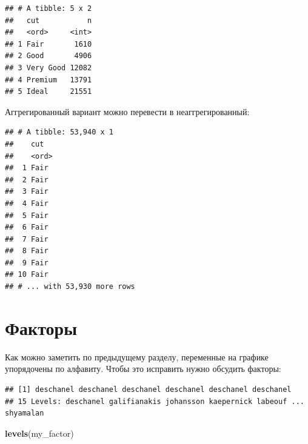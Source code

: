 \documentclass[
]{book}
\newenvironment{Shaded}{\begin{snugshade}}{\end{snugshade}}
\newcommand{\KeywordTok}[1]{\textcolor[rgb]{0.13,0.29,0.53}{\textbf{#1}}}
\newcommand{\NormalTok}[1]{#1}
\newcommand{\OperatorTok}[1]{\textcolor[rgb]{0.81,0.36,0.00}{\textbf{#1}}}
\newcommand{\StringTok}[1]{\textcolor[rgb]{0.31,0.60,0.02}{#1}}
\begin{document}
\begin{verbatim}
## # A tibble: 5 x 2
##   cut           n
##   <ord>     <int>
## 1 Fair       1610
## 2 Good       4906
## 3 Very Good 12082
## 4 Premium   13791
## 5 Ideal     21551
\end{verbatim}

Аггрегированный вариант можно перевести в неаггрегированный:

\begin{Shaded}
\end{Shaded}

\begin{verbatim}
## # A tibble: 53,940 x 1
##    cut  
##    <ord>
##  1 Fair 
##  2 Fair 
##  3 Fair 
##  4 Fair 
##  5 Fair 
##  6 Fair 
##  7 Fair 
##  8 Fair 
##  9 Fair 
## 10 Fair 
## # ... with 53,930 more rows
\end{verbatim}

\hypertarget{ux444ux430ux43aux442ux43eux440ux44b}{%
\section{Факторы}\label{ux444ux430ux43aux442ux43eux440ux44b}}

Как можно заметить по предыдущему разделу, переменные на графике упорядочены по алфавиту. Чтобы это исправить нужно обсудить факторы:

\begin{Shaded}
\end{Shaded}

\begin{verbatim}
## [1] deschanel deschanel deschanel deschanel deschanel deschanel
## 15 Levels: deschanel galifianakis johansson kaepernick labeouf ... shyamalan
\end{verbatim}

\begin{Shaded}
\begin{Highlighting}[]
\KeywordTok{levels}\NormalTok{(my_factor)}
\end{Highlighting}
\end{Shaded}
\end{document}
